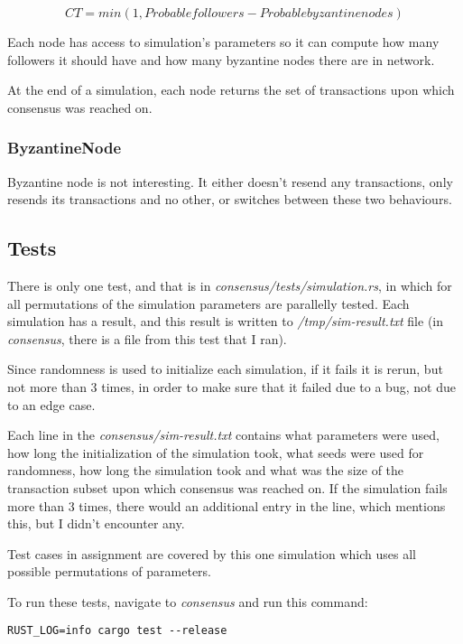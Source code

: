 \[ CT = min(1, Probable followers - Probable byzantine nodes) \]

Each node has access to simulation's parameters so it can compute how many
followers it should have and how many byzantine nodes there are in network.

At the end of a simulation, each node returns the set of transactions upon
which consensus was reached on.


\subsubsection*{ByzantineNode}

Byzantine node is not interesting. It either doesn't resend any transactions,
only resends its transactions and no other, or switches between these two
behaviours.

\subsection{Tests}

There is only one test, and that is in \emph{consensus/tests/simulation.rs},
in which for all permutations of the simulation parameters are parallelly tested.
Each simulation has a result, and this result is written to \emph{/tmp/sim-result.txt}
file (in \emph{consensus}, there is a file from this test that I ran).

Since randomness is used to initialize each simulation, if it fails it is rerun,
but not more than 3 times, in order to make sure that it failed due to a bug, not
due to an edge case.

Each line in the \emph{consensus/sim-result.txt} contains what parameters were used,
how long the initialization of the simulation took, what seeds were used for randomness,
how long the simulation took and what was the size of the transaction subset upon
which consensus was reached on. If the simulation fails more than 3 times, there
would an additional entry in the line, which mentions this, but I didn't encounter
any.

Test cases in assignment are covered by this one simulation which uses all possible
permutations of parameters.

To run these tests, navigate to \emph{consensus} and run this command:

\begin{verbatim}
RUST_LOG=info cargo test --release
\end{verbatim}
